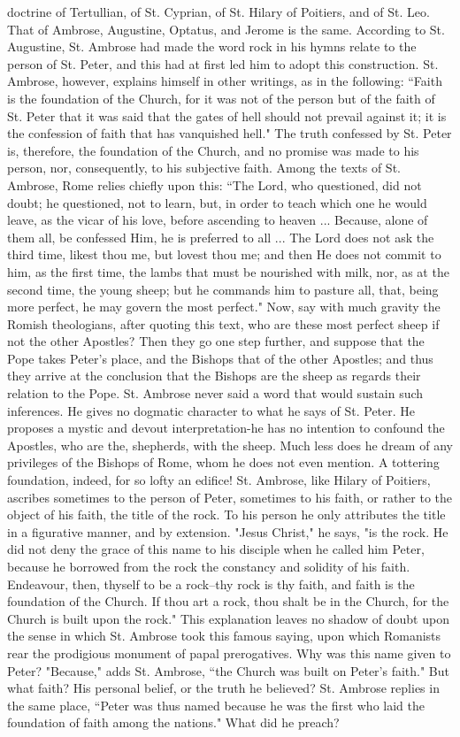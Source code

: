 doctrine of Tertullian, of St. Cyprian, of St. Hilary of Poitiers, and of St. Leo. That of Ambrose, Augustine, Optatus, and Jerome is the same. According to St. Augustine, St. Ambrose had made the word rock in his hymns relate to the person of St. Peter, and this had at first led him to adopt this construction. St. Ambrose, however, explains himself in other writings, as in the following: “Faith is the foundation of the Church, for it was not of the person but of the faith of St. Peter that it was said that the gates of hell should not prevail against it; it is the confession of faith that has vanquished hell." The truth confessed by St. Peter is, therefore, the foundation of the Church, and no promise was made to his person, nor, consequently, to his subjective faith. Among the texts of St. Ambrose, Rome relies chiefly upon this: “The Lord, who questioned, did not doubt; he questioned, not to learn, but, in order to teach which one he would leave, as the vicar of his love, before ascending to heaven ... Because, alone of them all, be confessed Him, he is preferred to all ... The Lord does not ask the third time, likest thou me, but lovest thou me; and then He does not commit to him, as the first time, the lambs that must be nourished with milk, nor, as at the second time, the young sheep; but he commands him to pasture all, that, being more perfect, he may govern the most perfect." Now, say with much gravity the Romish theologians, after quoting this text, who are these most perfect sheep if not the other Apostles? Then they go one step further, and suppose that the Pope takes Peter's place, and the Bishops that of the other Apostles; and thus they arrive at the conclusion that the Bishops are the sheep as regards their relation to the Pope. St. Ambrose never said a word that would sustain such inferences. He gives no dogmatic character to what he says of St. Peter. He proposes a mystic and devout interpretation-he has no intention to confound the Apostles, who are the, shepherds, with the sheep. Much less does he dream of any privileges of the Bishops of Rome, whom he does not even mention. A tottering foundation, indeed, for so lofty an edifice! St. Ambrose, like Hilary of Poitiers, ascribes sometimes to the person of Peter, sometimes to his faith, or rather to the object of his faith, the title of the rock. To his person he only attributes the title in a figurative manner, and by extension. "Jesus Christ," he says, "is the rock. He did not deny the grace of this name to his disciple when he called him Peter, because he borrowed from the rock the constancy and solidity of his faith. Endeavour, then, thyself to be a rock--thy rock is thy faith, and faith is the foundation of the Church. If thou art a rock, thou shalt be in the Church, for the Church is built upon the rock." This explanation leaves no shadow of doubt upon the sense in which St. Ambrose took this famous saying, upon which Romanists rear the prodigious monument of papal prerogatives. Why was this name given to Peter? "Because," adds St. Ambrose, “the Church was built on Peter's faith." But what faith? His personal belief, or the truth he believed? St. Ambrose replies in the same place, “Peter was thus named because he was the first who laid the foundation of faith among the nations." What did he preach? 
